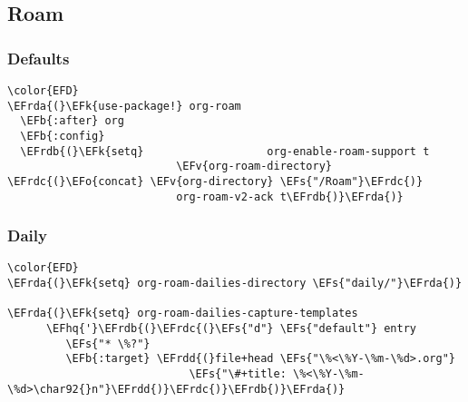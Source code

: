 \documentclass[c]{article}
\theoremstyle{plain}%
\theoremstyle{definition}
\theoremstyle{remark}
\newcommand{\EFs}[1]{\textcolor{EFs}{#1}} %
\newcommand{\EFk}[1]{\textcolor{EFk}{#1}} %
\newcommand{\EFb}[1]{\textcolor{EFb}{#1}} %
\newcommand{\EFv}[1]{\textcolor{EFv}{#1}} %
\newcommand{\EFo}[1]{\textcolor{EFo}{#1}} %
\newcommand{\EFhq}[1]{\textcolor{EFhq}{#1}} %
\newcommand{\EFrda}[1]{\textcolor{EFrda}{#1}} %
\newcommand{\EFrdb}[1]{\textcolor{EFrdb}{#1}} %
\newcommand{\EFrdc}[1]{\textcolor{EFrdc}{#1}} %
\newcommand{\EFrdd}[1]{\textcolor{EFrdd}{#1}} %
\begin{document}
\subsection{Roam}
\label{sec:org346483c}
\subsubsection{Defaults}
\label{sec:orgb0d2381}
\begin{Code}
\begin{Verbatim}
\color{EFD}
\EFrda{(}\EFk{use-package!} org-roam
  \EFb{:after} org
  \EFb{:config}
  \EFrdb{(}\EFk{setq}                   org-enable-roam-support t
                          \EFv{org-roam-directory} \EFrdc{(}\EFo{concat} \EFv{org-directory} \EFs{"/Roam"}\EFrdc{)}
                          org-roam-v2-ack t\EFrdb{)}\EFrda{)}

\end{Verbatim}
\end{Code}
\subsubsection{Daily}
\label{sec:org2d61f22}
\begin{Code}
\begin{Verbatim}
\color{EFD}
\EFrda{(}\EFk{setq} org-roam-dailies-directory \EFs{"daily/"}\EFrda{)}

\EFrda{(}\EFk{setq} org-roam-dailies-capture-templates
      \EFhq{'}\EFrdb{(}\EFrdc{(}\EFs{"d"} \EFs{"default"} entry
         \EFs{"* \%?"}
         \EFb{:target} \EFrdd{(}file+head \EFs{"\%<\%Y-\%m-\%d>.org"}
                            \EFs{"\#+title: \%<\%Y-\%m-\%d>\char92{}n"}\EFrdd{)}\EFrdc{)}\EFrdb{)}\EFrda{)}
\end{Verbatim}
\end{Code}
\end{document}
